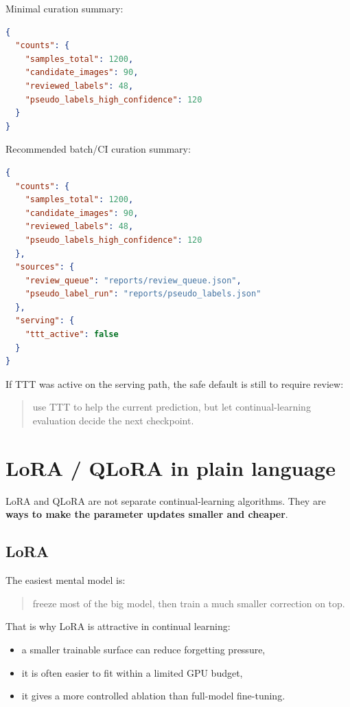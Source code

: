 Minimal curation summary:
\begin{lstlisting}[language=json]
{
  "counts": {
    "samples_total": 1200,
    "candidate_images": 90,
    "reviewed_labels": 48,
    "pseudo_labels_high_confidence": 120
  }
}
\end{lstlisting}

Recommended batch/CI curation summary:
\begin{lstlisting}[language=json]
{
  "counts": {
    "samples_total": 1200,
    "candidate_images": 90,
    "reviewed_labels": 48,
    "pseudo_labels_high_confidence": 120
  },
  "sources": {
    "review_queue": "reports/review_queue.json",
    "pseudo_label_run": "reports/pseudo_labels.json"
  },
  "serving": {
    "ttt_active": false
  }
}
\end{lstlisting}

If TTT was active on the serving path, the safe default is still to require review:
\begin{quote}
use TTT to help the current prediction, but let continual-learning evaluation decide the next checkpoint.
\end{quote}

\section{LoRA / QLoRA in plain language}
LoRA and QLoRA are not separate continual-learning algorithms.
They are \textbf{ways to make the parameter updates smaller and cheaper}.

\subsection{LoRA}
The easiest mental model is:
\begin{quote}
freeze most of the big model, then train a much smaller correction on top.
\end{quote}

That is why LoRA is attractive in continual learning:
\begin{itemize}
  \item a smaller trainable surface can reduce forgetting pressure,
  \item it is often easier to fit within a limited GPU budget,
  \item it gives a more controlled ablation than full-model fine-tuning.
\end{itemize}


